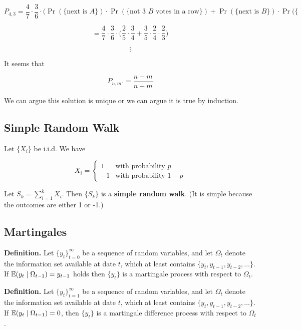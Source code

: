 \begin{solution}
\[
P_{4,3} = \frac{4}{7} \cdot \frac{3}{6} \cdot \bigg( \Pr(\{\text{next is } A\}) \cdot \Pr(\{\text{not 3 } B \text{ votes in a row}\})+ \Pr(\{\text{next is } B\}) \cdot \Pr( \{ 
\]

\[
= \frac{4}{7} \cdot \frac{3}{6} \cdot \bigg(\frac{2}{5} \cdot \frac{3}{4} + \frac{3}{5} \cdot \frac{2}{4} \cdot \frac{2}{3} \bigg) 
\]

\[
\vdots
\]

It seems that

\[
\boxed{
P_{n,m}.= \frac{n-m}{n+m}}
\]

We can argue this solution is unique or we can argue it is true by induction. 

\end{solution}


\subsection{Simple Random Walk}

\begin{definition}\label{sp.srw} Let \(\{X_i\}\) be i.i.d. We have

\[
X_i = \begin{cases}
1 & \text{with probability } p \\
-1 & \text{with probability } 1 - p
\end{cases}
\]

Let \(S_k = \sum_{i=1}^k X_i\). Then \(\{S_k\}\) is a \textbf{simple random walk}. (It is simple because the outcomes are either 1 or -1.)

\end{definition}

\subsection{Martingales}

\textbf{Definition.} Let \(\{y_t\}_{t=0}^\infty \) be a sequence of random variables, and let \(\Omega_t\) denote the information set available at date \(t\), which at least contains \(\{y_t, y_{t-1}, y_{t-2}, \ldots \}\). If \(\E(y_t \mid \Omega_{t-1}) = y_{t-1}\) holds then \(\{y_t\}\) is a martingale process with respect to \(\Omega_t\).

\textbf{Definition.} Let \(\{y_t\}_{t=1}^\infty \) be a sequence of random variables, and let \(\Omega_t\) denote the information set available at date \(t\), which at least contains \(\{y_t, y_{t-1}, y_{t-2}, \ldots \}\). If \(\E(y_t \mid \Omega_{t-1}) =0\), then \(\{y_t\}\) is a martingale difference process with respect to \(\Omega_t\).

